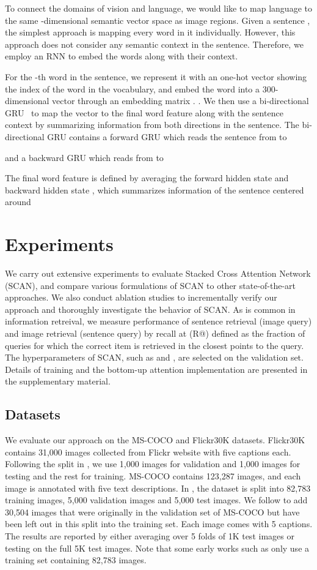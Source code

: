 \documentclass[runningheads]{llncs}
\begin{document}
To connect the domains of vision and language, we would like to map language to the same -dimensional semantic vector space as image regions. Given a sentence , the simplest approach is mapping every word in it individually. However, this approach does not consider any semantic context in the sentence. Therefore, we employ an RNN to embed the words along with their context.

For the -th word in the sentence, we represent it with an one-hot vector showing the index of the word in the vocabulary, and embed the word into a 300-dimensional vector through an embedding matrix . . We then use a bi-directional GRU~\cite{bahdanau2014neural,schuster1997bidirectional} to map the vector to the final word feature along with the sentence context by summarizing information from both directions in the sentence. The bi-directional GRU contains a forward GRU which reads the sentence  from  to 

and a backward GRU which reads from  to 

The final word feature  is defined by averaging the forward hidden state  and backward hidden state , which summarizes information of the sentence centered around 


\section{Experiments}
We carry out extensive experiments to evaluate Stacked Cross Attention Network (SCAN), and compare various formulations of SCAN to other state-of-the-art approaches. We also conduct ablation studies to incrementally verify our approach and thoroughly investigate the behavior of SCAN. As is common in information retreival, we measure performance of sentence retrieval (image query) and image retrieval (sentence query) by recall at  (R@) defined as the fraction of queries for which the correct item is retrieved in the closest  points to the query. The hyperparameters of SCAN, such as  and , are selected on the validation set. Details of training and the bottom-up attention implementation are presented in the supplementary material.

\subsection{Datasets}
We evaluate our approach on the MS-COCO and Flickr30K datasets. Flickr30K contains 31,000 images collected from Flickr website with five captions each. Following the split in \cite{karpathy2015deep,faghri2017vse++}, we use 1,000 images for validation and 1,000 images for testing and the rest for training. MS-COCO contains 123,287 images, and each image is annotated with five text descriptions. In \cite{karpathy2015deep}, the dataset is split into 82,783 training images, 5,000 validation images and 5,000 test images. We follow \cite{faghri2017vse++} to add 30,504 images that were originally in the validation set of MS-COCO but have been left out in this split into the training set. Each image comes with 5 captions. The results are reported by either averaging over 5 folds of 1K test images or testing on the full 5K test images. Note that some early works such as \cite{karpathy2015deep} only use a training set containing 82,783 images.
\end{document}
